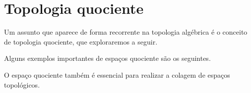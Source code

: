 \section{Topologia quociente}
\label{topologia-quociente}
Um assunto que aparece de forma recorrente na topologia algébrica é o conceito de topologia quociente, que exploraremos a seguir. 


Alguns exemplos importantes de espaços quociente são os seguintes.



O espaço quociente também é essencial para realizar a colagem de espaços topológicos.





